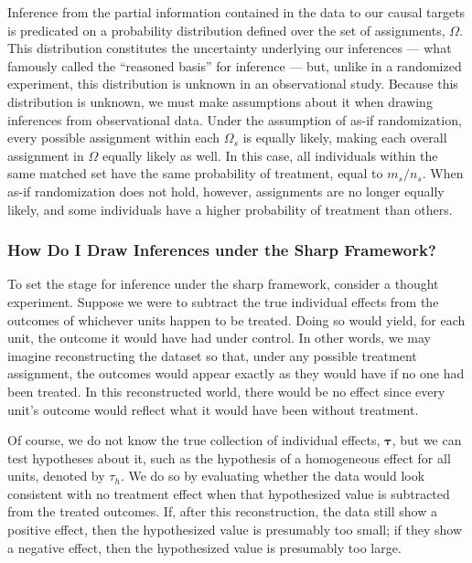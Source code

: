 \documentclass[
  12pt,
  leqno]{article}
\begin{document}
Inference from the partial information contained in the data to our
causal targets is predicated on a probability distribution defined over
the set of assignments, \(\Omega\). This distribution constitutes the
uncertainty underlying our inferences --- what \citet[p.~14]{fisher1935}
famously called the ``reasoned basis'' for inference --- but, unlike in
a randomized experiment, this distribution is unknown in an
observational study. Because this distribution is unknown, we must make
assumptions about it when drawing inferences from observational data.
Under the assumption of as-if randomization, every possible assignment
within each \(\Omega_s\) is equally likely, making each overall
assignment in \(\Omega\) equally likely as well. In this case, all
individuals within the same matched set have the same probability of
treatment, equal to \(m_s / n_s\). When as-if randomization does not
hold, however, assignments are no longer equally likely, and some
individuals have a higher probability of treatment than others.

\subsubsection{How Do I Draw Inferences under the Sharp
Framework?}\label{how-do-i-draw-inferences-under-the-sharp-framework}

To set the stage for inference under the sharp framework, consider a
thought experiment. Suppose we were to subtract the true individual
effects from the outcomes of whichever units happen to be treated. Doing
so would yield, for each unit, the outcome it would have had under
control. In other words, we may imagine reconstructing the dataset so
that, under any possible treatment assignment, the outcomes would appear
exactly as they would have if no one had been treated. In this
reconstructed world, there would be no effect since every unit's outcome
would reflect what it would have been without treatment.

Of course, we do not know the true collection of individual effects,
\(\bm{\tau}\), but we can test hypotheses about it, such as the
hypothesis of a homogeneous effect for all units, denoted by \(\tau_h\).
We do so by evaluating whether the data would look consistent with no
treatment effect when that hypothesized value is subtracted from the
treated outcomes. If, after this reconstruction, the data still show a
positive effect, then the hypothesized value is presumably too small; if
they show a negative effect, then the hypothesized value is presumably
too large.
\end{document}
